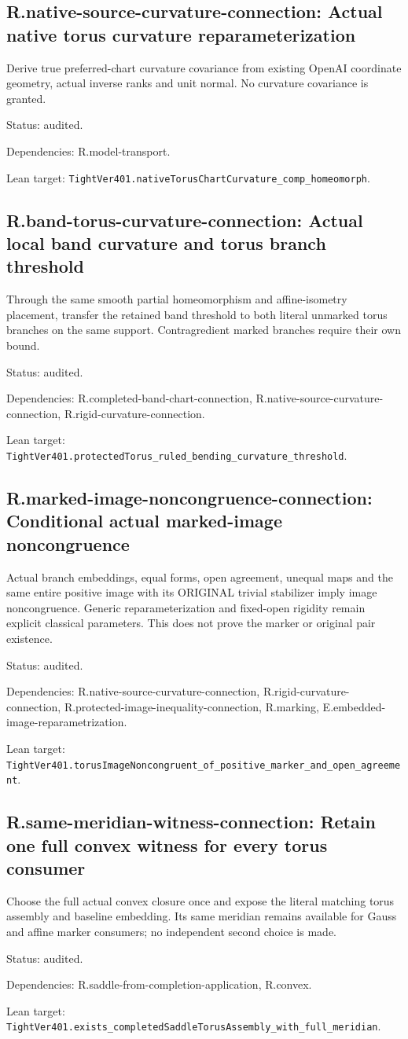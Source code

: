 \documentclass{article}
\begin{document}
\subsection*{R.native-source-curvature-connection: Actual native torus curvature reparameterization}
Derive true preferred-chart curvature covariance from existing OpenAI coordinate geometry, actual inverse ranks and unit normal. No curvature covariance is granted.
\par Status: audited.
\par Dependencies: R.model-transport.
\par Lean target: \texttt{TightVer401.nativeTorusChartCurvature\_comp\_homeomorph}.
\subsection*{R.band-torus-curvature-connection: Actual local band curvature and torus branch threshold}
Through the same smooth partial homeomorphism and affine-isometry placement, transfer the retained band threshold to both literal unmarked torus branches on the same support. Contragredient marked branches require their own bound.
\par Status: audited.
\par Dependencies: R.completed-band-chart-connection, R.native-source-curvature-connection, R.rigid-curvature-connection.
\par Lean target: \texttt{TightVer401.protectedTorus\_ruled\_bending\_curvature\_threshold}.
\subsection*{R.marked-image-noncongruence-connection: Conditional actual marked-image noncongruence}
Actual branch embeddings, equal forms, open agreement, unequal maps and the same entire positive image with its ORIGINAL trivial stabilizer imply image noncongruence. Generic reparameterization and fixed-open rigidity remain explicit classical parameters. This does not prove the marker or original pair existence.
\par Status: audited.
\par Dependencies: R.native-source-curvature-connection, R.rigid-curvature-connection, R.protected-image-inequality-connection, R.marking, E.embedded-image-reparametrization.
\par Lean target: \texttt{TightVer401.torusImageNoncongruent\_of\_positive\_marker\_and\_open\_agreement}.
\subsection*{R.same-meridian-witness-connection: Retain one full convex witness for every torus consumer}
Choose the full actual convex closure once and expose the literal matching torus assembly and baseline embedding. Its same meridian remains available for Gauss and affine marker consumers; no independent second choice is made.
\par Status: audited.
\par Dependencies: R.saddle-from-completion-application, R.convex.
\par Lean target: \texttt{TightVer401.exists\_completedSaddleTorusAssembly\_with\_full\_meridian}.
\end{document}
